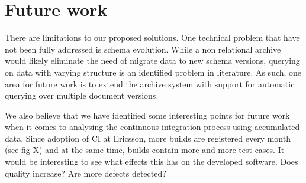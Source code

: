 \section{Future work}
There are limitations to our proposed solutions. One technical problem that have not been fully addressed is schema evolution. While a non relational archive would likely eliminate the need of migrate data to new schema versions, querying on data with varying structure is an identified problem in literature. As such, one area for future work is to extend the archive system with support for automatic querying over multiple document versions.

We also believe that we have identified some interesting points for future work when it comes to analysing the continuous integration process using accumulated data. Since adoption of CI at Ericsson, more builds are registered every month (see fig X) and at the same time, builds contain more and more test cases. It would be interesting to see what effects this has on the developed software. Does quality increase? Are more defects detected? 